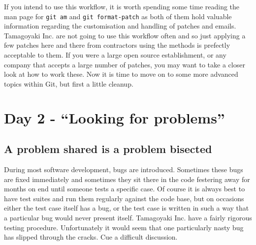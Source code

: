 If you intend to use this workflow, it is worth spending some time reading the man page for \texttt{git am} and \texttt{git format-patch} as both of them hold valuable information regarding the customisation and handling of patches and emails.
Tamagoyaki Inc. are not going to use this workflow often and so just applying a few patches here and there from contractors using the methods is prefectly acceptable to them.
If you were a large open source establishment, or any company that accepts a large number of patches, you may want to take a closer look at how to work these.
Now it is time to move on to some more advanced topics within Git, but first a little cleanup.


\section{Day 2 - ``Looking for problems''}
\subsection{A problem shared is a problem bisected}
During most software development, bugs are introduced.
Sometimes these bugs are fixed immediately and sometimes they sit there in the code festering away for months on end until someone tests a specific case.
Of course it is always best to have test suites and run them regularly against the code base, but on occasions either the test case itself has a bug,
or the test case is written in such a way that a particular bug would never present itself.
Tamagoyaki Inc. have a fairly rigorous testing procedure.
Unfortunately it would seem that one particularly nasty bug has slipped through the cracks.
Cue a difficult discussion.


